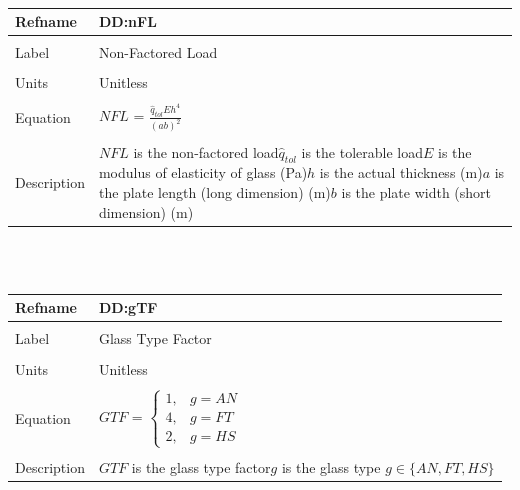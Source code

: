 \documentclass[12pt]{article}
\begin{document}
~\newline
\noindent \begin{minipage}{\textwidth}
\begin{tabular}{p{} p{}}
\toprule \textbf{Refname} & \textbf{DD:nFL}
\label{DD:nFL}
\\ \midrule \\
Label & Non-Factored Load
\\ \midrule \\
Units & Unitless
\\ \midrule \\
Equation & $NFL$ = $\frac{{\hat{q}_{tol}} E h^{4}}{\left(a b\right)^{2}}$
\\ \midrule \\
Description & $NFL$ is the non-factored load\newline${\hat{q}_{tol}}$ is the tolerable load\newline$E$ is the modulus of elasticity of glass (Pa)\newline$h$ is the actual thickness (m)\newline$a$ is the plate length (long dimension) (m)\newline$b$ is the plate width (short dimension) (m)
\\ \bottomrule \end{tabular}
\end{minipage}\\
~\newline
\noindent \begin{minipage}{\textwidth}
\begin{tabular}{p{} p{}}
\toprule \textbf{Refname} & \textbf{DD:gTF}
\label{DD:gTF}
\\ \midrule \\
Label & Glass Type Factor
\\ \midrule \\
Units & Unitless
\\ \midrule \\
Equation & $GTF$ = $\begin{cases}
1, & g=AN\\
4, & g=FT\\
2, & g=HS
\end{cases}$
\\ \midrule \\
Description & $GTF$ is the glass type factor\newline$g$ is the glass type $g\in{}\{AN, FT, HS\}$
\\ \bottomrule \end{tabular}
\end{minipage}\\
\end{document}
